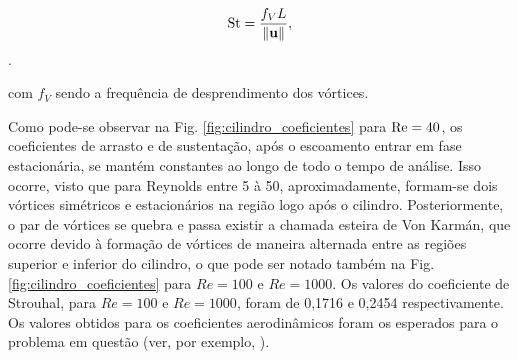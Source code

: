 \documentclass[tese_patricia]{subfiles}%
\begin{document}
\begin{align}
	\mathrm{St} = \frac{f_{V}L}{\lVert \mathbf{u} \lVert},
\end{align}.

\noindent com $f_{V}$ sendo a frequência de desprendimento dos vórtices.

Como pode-se observar na Fig. \ref{fig:cilindro_coeficientes} para $\mathrm{Re} = 40$, os coeficientes de arrasto e de sustentação, após o escoamento entrar em fase estacionária, se mantém constantes ao longo de todo o tempo de análise. Isso ocorre, visto que para Reynolds entre 5 à 50, aproximadamente, formam-se dois vórtices simétricos e estacionários na região logo após o cilindro. Posteriormente, o par de vórtices se quebra e passa existir a chamada esteira de Von Karmán, que ocorre devido à formação de vórtices de maneira alternada entre as regiões superior e inferior do cilindro, o que pode ser notado também na Fig. \ref{fig:cilindro_coeficientes}  para $Re = 100$ e $Re=1000$. Os valores do coeficiente de Strouhal, para $Re = 100$ e $Re=1000$, foram de 0,1716 e 0,2454 respectivamente. Os valores obtidos para os coeficientes aerodinâmicos foram os esperados para o problema em questão (ver, por exemplo, ).
\end{document}
